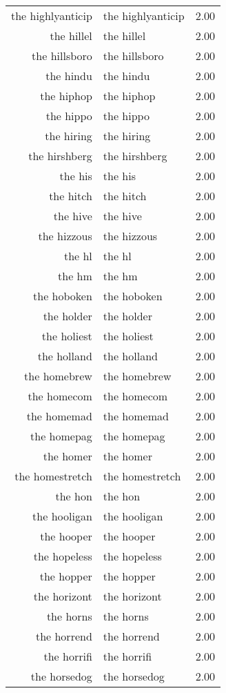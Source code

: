 \begin{table}[ht]
\begin{tabular}{rlr}
  the highlyanticip & the highlyanticip & 2.00 \\ 
  the hillel & the hillel & 2.00 \\ 
  the hillsboro & the hillsboro & 2.00 \\ 
  the hindu & the hindu & 2.00 \\ 
  the hiphop & the hiphop & 2.00 \\ 
  the hippo & the hippo & 2.00 \\ 
  the hiring & the hiring & 2.00 \\ 
  the hirshberg & the hirshberg & 2.00 \\ 
  the his & the his & 2.00 \\ 
  the hitch & the hitch & 2.00 \\ 
  the hive & the hive & 2.00 \\ 
  the hizzous & the hizzous & 2.00 \\ 
  the hl & the hl & 2.00 \\ 
  the hm & the hm & 2.00 \\ 
  the hoboken & the hoboken & 2.00 \\ 
  the holder & the holder & 2.00 \\ 
  the holiest & the holiest & 2.00 \\ 
  the holland & the holland & 2.00 \\ 
  the homebrew & the homebrew & 2.00 \\ 
  the homecom & the homecom & 2.00 \\ 
  the homemad & the homemad & 2.00 \\ 
  the homepag & the homepag & 2.00 \\ 
  the homer & the homer & 2.00 \\ 
  the homestretch & the homestretch & 2.00 \\ 
  the hon & the hon & 2.00 \\ 
  the hooligan & the hooligan & 2.00 \\ 
  the hooper & the hooper & 2.00 \\ 
  the hopeless & the hopeless & 2.00 \\ 
  the hopper & the hopper & 2.00 \\ 
  the horizont & the horizont & 2.00 \\ 
  the horns & the horns & 2.00 \\ 
  the horrend & the horrend & 2.00 \\ 
  the horrifi & the horrifi & 2.00 \\ 
  the horsedog & the horsedog & 2.00 \\ 

\end{tabular}
\end{table}
